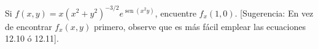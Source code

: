\item Si $f(x, y) = x(x^2+y^2)^{-3/2}e^{\operatorname{sen}(x^2y)}$, encuentre $f_x(1, 0)$. [Sugerencia: En vez de encontrar $f_x(x, y)$ primero, observe que es más fácil emplear las ecuaciones 12.10 ó 12.11].

